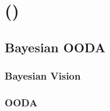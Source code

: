 \chapter{\fullBTP (\abbrBTP)}


\section{Bayesian OODA}
\subsection{Bayesian Vision}
\subsection{OODA}
%
%
%
%
%
%
%
%
%
%
%
